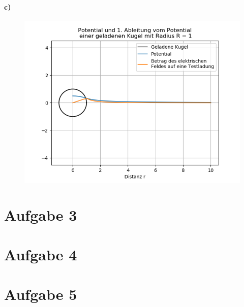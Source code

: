 \documentclass[a4paper]{article}
\begin{document}
\paragraph{c)}
\mbox{}
\begin{figure}[H]
	\centering
	\includegraphics[width=15cm]{aufgabe2_efeld_analytisch.png}
\end{figure}
\newpage

\section*{Aufgabe 3}
\section*{Aufgabe 4}
\section*{Aufgabe 5}
\end{document}
